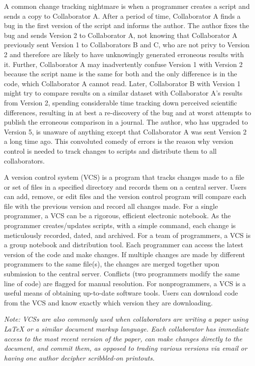 \documentclass[ChapterTOCs,krantz2]{krantz} %
\begin{document}
A common change tracking nightmare 
is when a programmer creates a script 
and sends a copy to Collaborator A. After a period of time, 
Collaborator A finds a bug in the first version of the script and informs
the author. The author fixes the bug and sends Version 2
to Collaborator A, not knowing that Collaborator A 
previously sent Version 1 to Collaborators B and C, who are not privy to Version 2 
and therefore are likely to have unknowingly generated erroneous results with it.  
Further, Collaborator A may inadvertently confuse Version 1
with Version 2 because the script name is the same for both and
the only difference is in the code, which Collaborator A cannot read. Later, 
Collaborator B with Version 1 might try to compare
results on a similar dataset with Collaborator A's results from Version 2,
spending considerable time tracking down perceived scientific differences, 
resulting in at best a re-discovery of the bug and at
worst attempts to publish the erroneous comparison in a journal.  The author, 
who has upgraded to Version 5, 
is unaware of anything except that 
Collaborator A was sent Version 2 a long time ago.  This convoluted 
comedy of errors is the reason why version control is needed to track changes to 
scripts and distribute them to all collaborators.

A version control system
(VCS) is a program that tracks changes made to a file or set of files in a specified
directory and records them on a central server. Users can add, remove,
or edit files and the version control program will compare each file
with the previous version and record all changes made. For a single programmer,
a VCS can be a rigorous, efficient electronic notebook.  As the programmer
creates/updates scripts, with a simple command, each change is meticulously
recorded, dated, and archived.  For a team of programmers, a VCS
is a group notebook and distribution tool.  Each programmer can access the
latest version of the code and make changes.  If multiple changes are made by
different programmers to the same file(s), the changes are merged together 
upon submission to the central server. Conflicts (two
programmers modify the same line of code) are flagged for manual resolution.  
For nonprogrammers, a VCS is a
useful means of obtaining up-to-date software tools.  Users can download code
from the VCS and know exactly which version they are downloading.

\textsl{Note: VCSs are also commonly used when collaborators are writing 
a paper using LaTeX or a similar document markup language.  Each collaborator 
has immediate access to the most recent version of the paper, can make 
changes directly to the document, and commit them, as opposed 
to trading various versions via email or having one author decipher scribbled-on 
printouts.}
\end{document}
